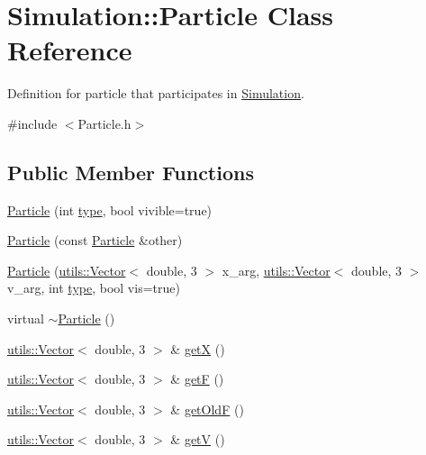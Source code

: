 \hypertarget{classSimulation_1_1Particle}{\section{Simulation\-:\-:Particle Class Reference}
\label{classSimulation_1_1Particle}
}


Definition for particle that participates in \hyperlink{namespaceSimulation}{Simulation}.  




{\ttfamily \#include $<$Particle.\-h$>$}

\subsection*{Public Member Functions}
\begin{DoxyCompactItemize}
\item 
\hyperlink{classSimulation_1_1Particle_ac41912df0ce136018e70f568aef0d6dd}{Particle} (int \hyperlink{classSimulation_1_1Particle_aeb6388e2a21c03c7e1582eb4eeb5efb3}{type}, bool vivible=true)
\item 
\hyperlink{classSimulation_1_1Particle_a24b04cb7c6f7ea4242d25c410f44ae56}{Particle} (const \hyperlink{classSimulation_1_1Particle}{Particle} \&other)
\item 
\hyperlink{classSimulation_1_1Particle_adb4ed8bc5618347a28cbbdaf0047309c}{Particle} (\hyperlink{classutils_1_1Vector}{utils\-::\-Vector}$<$ double, 3 $>$ x\-\_\-arg, \hyperlink{classutils_1_1Vector}{utils\-::\-Vector}$<$ double, 3 $>$ v\-\_\-arg, int \hyperlink{classSimulation_1_1Particle_aeb6388e2a21c03c7e1582eb4eeb5efb3}{type}, bool vis=true)
\item 
virtual \hyperlink{classSimulation_1_1Particle_ad030d0fe7b88cf81744b127c99244ff4}{$\sim$\-Particle} ()
\item 
\hyperlink{classutils_1_1Vector}{utils\-::\-Vector}$<$ double, 3 $>$ \& \hyperlink{classSimulation_1_1Particle_ab7ade5dc156dfa0234aa0323564e46ed}{get\-X} ()
\item 
\hyperlink{classutils_1_1Vector}{utils\-::\-Vector}$<$ double, 3 $>$ \& \hyperlink{classSimulation_1_1Particle_acd84c445e2bd5f5280a00e76cfe73fe0}{get\-F} ()
\item 
\hyperlink{classutils_1_1Vector}{utils\-::\-Vector}$<$ double, 3 $>$ \& \hyperlink{classSimulation_1_1Particle_a1204435fc08c697b0fea230616d1bbdf}{get\-Old\-F} ()
\item 
\hyperlink{classutils_1_1Vector}{utils\-::\-Vector}$<$ double, 3 $>$ \& \hyperlink{classSimulation_1_1Particle_aaf3ecbc6e1e31b259fe239461ba13dbd}{get\-V} ()

\end{DoxyCompactItemize}
